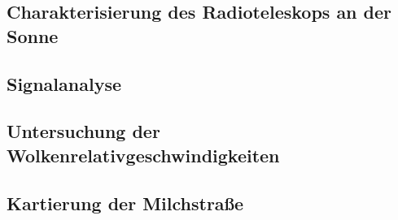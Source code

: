\documentclass[../main.tex]{subfiles}
\begin{document}
    
    \subsection{Charakterisierung des Radioteleskops an der Sonne}\label{subsec:2:Sonne}
        

    \subsection{Signalanalyse}
        

    \subsection{Untersuchung der Wolkenrelativgeschwindigkeiten}
        

    \subsection{Kartierung der Milchstraße}
        
        
\end{document}

